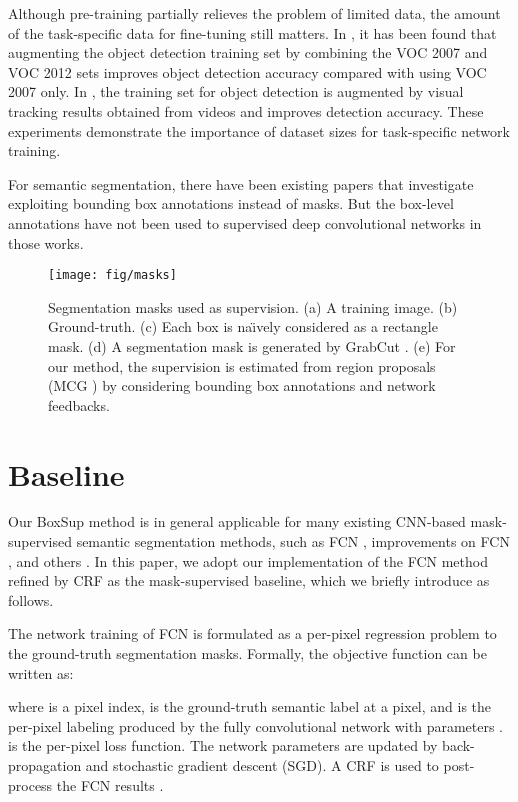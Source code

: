 \documentclass[10pt,twocolumn,letterpaper]{article}
\begin{document}
Although pre-training partially relieves the problem of limited data, the amount of the task-specific data for fine-tuning still matters. In \cite{agrawal2014analyzing}, it has been found that augmenting the object detection training set by combining the VOC 2007 and VOC 2012 sets improves object detection accuracy compared with using VOC 2007 only. In \cite{Liang2014}, the training set for object detection is augmented by visual tracking results obtained from videos and improves detection accuracy. These experiments demonstrate the importance of dataset sizes for task-specific network training.

For semantic segmentation, there have been existing papers \cite{xia2013semantic,guillaumin2014imagenet} that investigate exploiting bounding box annotations instead of masks. But the box-level annotations have not been used to supervised deep convolutional networks in those works.

\begin{figure*}[t]
	\centering
	\texttt{[image: fig/masks]}
	\caption{Segmentation masks used as supervision. (a) A training image. (b) Ground-truth. (c) Each box is na\"{\i}vely considered as a rectangle mask. (d) A segmentation mask is generated by GrabCut \cite{rother2004grabcut}. (e) For our method, the supervision is estimated from region proposals (MCG \cite{arbelaez2014multiscale}) by considering bounding box annotations and network feedbacks.}
	\label{fig:masks}
\end{figure*}

\section{Baseline}
\label{sec:baseline}

Our BoxSup method is in general applicable for many existing CNN-based mask-supervised semantic segmentation methods, such as FCN \cite{Long2015}, improvements on FCN \cite{Chen2015,zheng2015conditional}, and others
\cite{Hariharan2015,Dai2015,mostajabi2014feedforward}. In this paper, we adopt our implementation of the FCN method \cite{Long2015} refined by CRF \cite{Chen2015} as the mask-supervised baseline, which we briefly introduce as follows.

The network training of FCN \cite{Long2015} is formulated as a per-pixel regression problem to the ground-truth segmentation masks. Formally, the objective function can be written as:

where  is a pixel index,  is the ground-truth semantic label at a pixel, and  is the per-pixel labeling produced by the fully convolutional network with parameters .
 is the per-pixel loss function. The network parameters  are updated by back-propagation and stochastic gradient descent (SGD). A CRF is used to post-process the FCN results \cite{Chen2015}.
\end{document}

